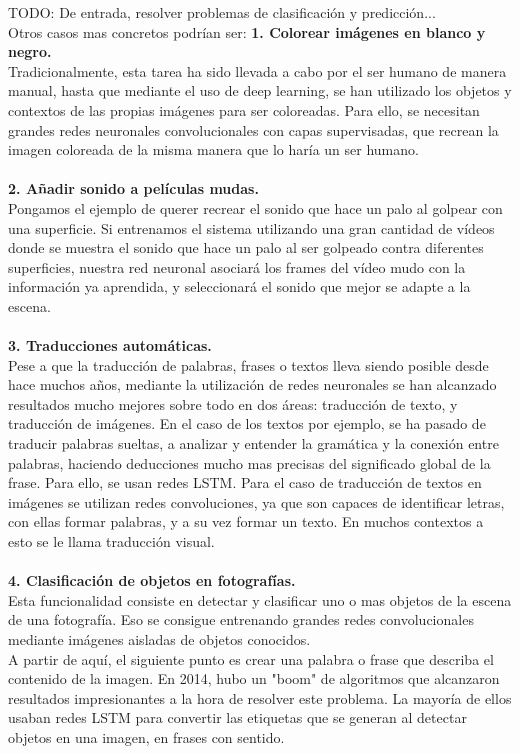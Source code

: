 TODO: De entrada, resolver problemas de clasificación y predicción...\\
Otros casos mas concretos podrían ser:
\textbf{1. Colorear imágenes en blanco y negro.}\\
Tradicionalmente, esta tarea ha sido llevada a cabo por el ser humano de manera manual, hasta que mediante el uso de deep learning, se han utilizado los objetos y contextos de las propias imágenes para ser coloreadas. Para ello, se necesitan grandes redes neuronales convolucionales con capas supervisadas, que recrean la imagen coloreada de la misma manera que lo haría un ser humano.\\
\\\textbf{2. Añadir sonido a películas mudas.}\\
Pongamos el ejemplo de querer recrear el sonido que hace un palo al golpear con una superficie. Si entrenamos el sistema utilizando una gran cantidad de vídeos donde se muestra el sonido que hace un palo al ser golpeado contra diferentes superficies, nuestra red neuronal asociará los frames del vídeo mudo con la información ya aprendida, y seleccionará el sonido que mejor se adapte a la escena.\\
\\\textbf{3. Traducciones automáticas.}\\
Pese a que la traducción de palabras, frases o textos lleva siendo posible desde hace muchos años, mediante la utilización de redes neuronales se han alcanzado resultados mucho mejores sobre todo en dos áreas: traducción de texto, y traducción de imágenes. En el caso de los textos por ejemplo, se ha pasado de traducir palabras sueltas, a analizar y entender la gramática y la conexión entre palabras, haciendo deducciones mucho mas precisas del significado global de la frase. Para ello, se usan redes LSTM. Para el caso de traducción de textos en imágenes se utilizan redes convoluciones, ya que son capaces de identificar letras, con ellas formar palabras, y a su vez formar un texto. En muchos contextos a esto se le llama traducción visual.\\
\\\textbf{4. Clasificación de objetos en fotografías.}\\
Esta funcionalidad consiste en detectar y clasificar uno o mas objetos de la escena de una fotografía. Eso se consigue entrenando grandes redes convolucionales mediante imágenes aisladas de objetos conocidos.\\
A partir de aquí, el siguiente punto es crear una palabra o frase que describa el contenido de la imagen. En 2014, hubo un "boom" de algoritmos que alcanzaron resultados impresionantes a la hora de resolver este problema. La mayoría de ellos usaban redes LSTM para convertir las etiquetas que se generan al detectar objetos en una imagen, en frases con sentido.\\
